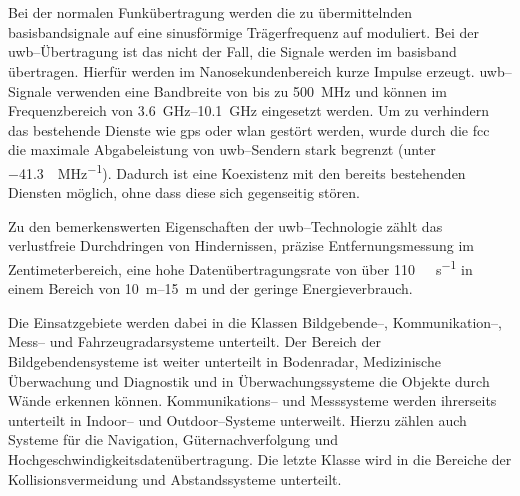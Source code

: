 \begin{comment}
Fragestellung:
- Welche elektrische Beschaltung ist notwendig um das DWM1000 Modul von DecaWave in Betrieb nehmen zu können?
- Wie erfolgt die Entfernungsmessung zwischen den einzelnen UWB--Modulen?
- Wie erfolgt der Datenaustausch zwischen einem UWB--Modul und der Verarbeitungseinheit?
\end{comment}

\begin{comment}
------------------------------------------------------------------------------------------
Schmalbandkommunikation (engl. Narrowband)
Frequenzband (engl. Radio spectrum)
Frequenzspreizung (engl. spread spectrum)
Basisband (engl. Baseband)
https://en.wikipedia.org/wiki/Ultra-wideband
\end{comment}
\chapter{}
\label{ch:uwb}

Bei der normalen Funkübertragung werden die zu übermittelnden \Gls{basisband}signale auf eine sinusförmige Trägerfrequenz auf moduliert. Bei der \Gls{uwb}--Übertragung ist das nicht der Fall, die Signale werden im \Gls{basisband} übertragen. Hierfür werden im Nanosekundenbereich kurze Impulse erzeugt. \Gls{uwb}--Signale verwenden eine Bandbreite von bis zu \SI{500}{\MHz} und können im Frequenzbereich von \SIrange{3.6}{10.1}{\GHz} eingesetzt werden. Um zu verhindern das bestehende Dienste wie \Gls{gps} oder \Gls{wlan} gestört werden, wurde durch die \Gls{fcc} die maximale Abgabeleistung von \Gls{uwb}--Sendern stark begrenzt (unter \SI[per-mode=symbol]{-41.3}{\dBm\per\MHz}). Dadurch ist eine Koexistenz mit den bereits bestehenden Diensten möglich, ohne dass diese sich gegenseitig stören. \cite{win1998impulse, yang2004uwbcom, fontana2004recent, aiello2006ultra, yavari2014ultra}

Zu den bemerkenswerten Eigenschaften der \Gls{uwb}--Technologie zählt das verlustfreie Durchdringen von Hindernissen, präzise Entfernungsmessung im Zentimeterbereich, eine hohe Datenübertragungsrate von über \SI[per-mode=symbol]{110}{\mega\byte\per\second} in einem Bereich von \SIrange{10}{15}{\metre} und der geringe Energieverbrauch. \cite{yang2004uwbcom}

Die Einsatzgebiete werden dabei in die Klassen Bildgebende--, Kommunikation--, Mess-- und Fahrzeugradarsysteme unterteilt. Der Bereich der Bildgebendensysteme ist weiter unterteilt in Bodenradar, Medizinische Überwachung und Diagnostik und in Überwachungssysteme die Objekte durch Wände erkennen können. Kommunikations-- und Messsysteme werden ihrerseits unterteilt in Indoor-- und Outdoor--Systeme unterweilt. Hierzu zählen auch Systeme für die Navigation, Güternachverfolgung und Hochgeschwindigkeitsdatenübertragung. Die letzte Klasse wird in die Bereiche der Kollisionsvermeidung und Abstandssysteme unterteilt. \cite{yang2004uwbcom, lakkundi2006ultra, pan2007medical}


